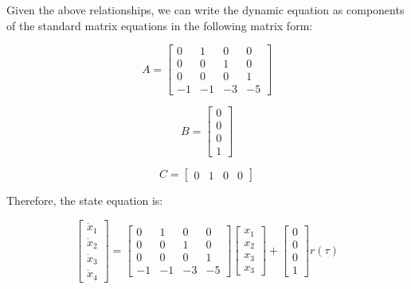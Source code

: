 \documentclass[12pt, letterpaper]{../assignment}
\begin{document}
Given the above relationships, we can write the dynamic equation as components of the standard matrix equations in the following matrix form:

\begin{equation*}
    A = \begin{bmatrix}
        0 & 1 & 0 & 0 \\
        0 & 0 & 1 & 0 \\
        0 & 0 & 0 & 1 \\
        -1 & -1 & -3 & -5
    \end{bmatrix}
\end{equation*}

\begin{equation*}
    B = \begin{bmatrix}
        0\\ 0\\ 0\\ 1
    \end{bmatrix}
\end{equation*}

\begin{equation*}
    C = \begin{bmatrix}
        0 & 1 & 0 & 0
    \end{bmatrix}
\end{equation*}

Therefore, the state equation is:

\begin{answer}
    \begin{equation*}
        \begin{bmatrix}
            \dot{x}_1\\ \dot{x}_2\\ \dot{x}_3\\ \dot{x}_4
        \end{bmatrix}=
        \begin{bmatrix}
            0 & 1 & 0 & 0 \\
            0 & 0 & 1 & 0 \\
            0 & 0 & 0 & 1 \\
            -1 & -1 & -3 & -5
        \end{bmatrix}
        \begin{bmatrix}
            x_1\\ x_2\\ x_3\\ x_3
        \end{bmatrix}
        + \begin{bmatrix}
            0\\ 0\\ 0\\ 1
        \end{bmatrix} r(\tau)
    \end{equation*}
\end{answer}
\end{document}
